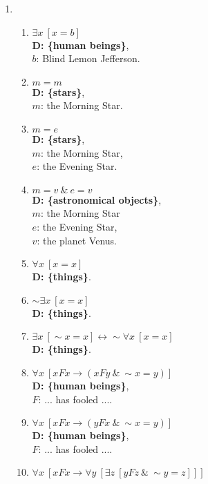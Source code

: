 \documentclass[a4paper,12pt]{article}
\newcommand{\ra}{\rightarrow}
\newcommand{\lra}{\leftrightarrow}
\newcommand{\s}{\sim}
\newcommand{\ta}{ \ \& \ }
\newcommand{\all}{\forall}
\newcommand{\ex}{\exists}
\begin{document}
    \begin{enumerate}[label=\arabic*,leftmargin=*]
        \item
            \begin{enumerate}[label=(\roman*)]
                \item $\ex x \ [x=b]$\\
                    \textbf{D: \{human beings\}},\\
                    $b$: Blind Lemon Jefferson.
                \item $m=m$\\
                    \textbf{D: \{stars\}},\\
                    $m$: the Morning Star.
                \item $m=e$\\
                    \textbf{D: \{stars\}},\\
                    $m$: the Morning Star,\\
                    $e$: the Evening Star.
                \item $m=v \ta e=v$\\
                    \textbf{D: \{astronomical objects\}},\\
                    $m$: the Morning Star\\
                    $e$: the Evening Star,\\
                    $v$: the planet Venus.
                \item $\all x \ [x=x]$\\
                    \textbf{D: \{things\}}.
                \item $\s \ex x \ [x=x]$\\
                    \textbf{D: \{things\}}.
                \item $\ex x \ [\s x=x] \lra \s \all x \ [x=x]$\\
                    \textbf{D: \{things\}}.
                \item $\all x \ [xFx \ra (xFy \ta \s x=y)]$\\
                    \textbf{D: \{human beings\}},\\
                    $F$: ... has fooled ....
                \item $\all x \ [xFx \ra (yFx \ta \s x=y)]$\\
                    \textbf{D: \{human beings\}},\\
                    $F$: ... has fooled ....
                \item $\all x \ [xFx \ra \all y \ [\ex z \ [yFz \ta \s y=z]]]$\\

\end{enumerate}
\end{enumerate}
\end{document}
